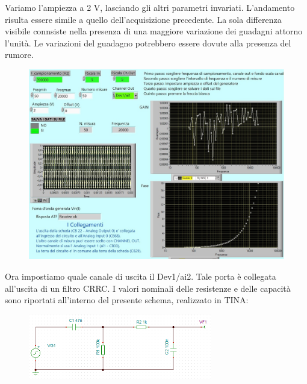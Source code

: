 
Variamo l'ampiezza a 2 V, lasciando gli altri parametri invariati.
L'andamento risulta essere simile a quello dell'acquisizione precedente. La sola differenza visibile connsiste nella presenza di una maggiore variazione dei guadagni attorno l'unità. Le variazioni del guadagno potrebbero essere dovute alla presenza del rumore.

\begin{figure}[H]
\caption{}
    \includegraphics[width=12cm]{settimana_2/immagini/corto_6.jpg}
    \centering
\end{figure}

Ora impostiamo quale canale di uscita il Dev1/ai2. Tale porta è collegata all'uscita di un filtro CRRC. I valori nominali delle resistenze e delle capacità sono riportati all'interno del presente schema, realizzato in TINA:
\begin{figure}[H]
\caption{}
    \includegraphics[width=8cm]{settimana_2/immagini/ImmagineCRRC.png}
    \centering
\end{figure}

